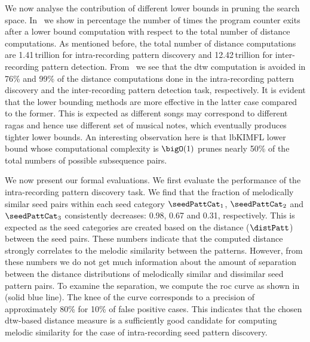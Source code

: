 We now analyse the contribution of different lower bounds in pruning the search space. In~ we show in percentage the number of times the program counter exits after a lower bound computation with respect to the total number of distance computations. As mentioned before, the total number of distance computations are 1.41\,trillion for intra-recording pattern discovery and 12.42\,trillion for inter-recording pattern detection. From~ we see that the \gls{dtw} computation is avoided in 76\% and 99\% of the distance computations done in the intra-recording pattern discovery and the inter-recording pattern detection task, respectively. It is evident that the lower bounding methods are more effective in the latter case compared to the former. This is expected as different songs may correspond to different \glspl{raga} and hence use different set of musical notes, which eventually produces tighter lower bounds. An interesting observation here is that \acrshort{lbKIMFL} lower bound whose computational complexity is $\bigO(1)$ prunes nearly 50\% of the total numbers of possible subsequence pairs. 

We now present our formal evaluations. We first evaluate the performance of the intra-recording pattern discovery task. We find that the fraction of melodically similar seed pairs within each seed category $\seedPattCat_1$, $\seedPattCat_2$ and $\seedPattCat_3$ consistently decreases: 0.98, 0.67 and 0.31, respectively. This is expected as the seed categories are created based on the distance ($\distPatt$) between the seed pairs. These numbers indicate that the computed distance strongly correlates to the melodic similarity between the patterns. However, from these numbers we do not get much information about the amount of separation between the distance distributions of melodically similar and dissimilar seed pattern pairs. To examine the separation, we compute the \acrshort{roc} curve as shown in~ (solid blue line). The knee of the curve corresponds to a precision of approximately 80\% for 10\% of false positive cases. This indicates that the chosen \gls{dtw}-based distance measure is a sufficiently good candidate for computing melodic similarity for the case of intra-recording seed pattern discovery. 


